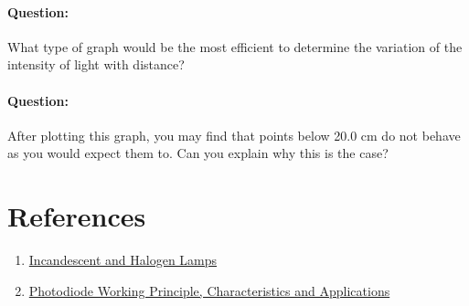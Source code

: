 \paragraph{Question:} What type of graph would be the most efficient to determine the variation of the intensity of light with distance?

\paragraph{Question:} After plotting this graph, you may find that points below 20.0 cm do not behave as you would expect them to. Can you explain why this is the case?


\section*{References}

\begin{enumerate}

\item \href{https://www.fh-muenster.de/ciw/downloads/personal/juestel/juestel/4-InkohaerenteLichtquellen-Glueh-_und_Halogenlampen_english_-1.pdf}{Incandescent and Halogen Lamps}

\item \href{https://www.elprocus.com/photodiode-working-principle-applications/}{Photodiode Working Principle, Characteristics and Applications}

\end{enumerate}



\newpage